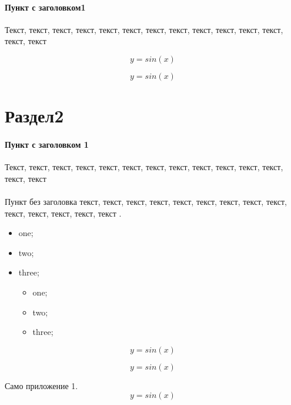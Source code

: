 \documentclass[12pt, final, a4paper, oneside]{extarticle}
\begin{document}
\paragraph{Пункт с заголовком1}
Текст, текст, текст, текст, текст, текст, текст, текст, текст, текст, текст, текст, текст, текст

\begin{equation}
  y = sin(x)
\end{equation}

\begin{equation}
  y = sin(x)
\end{equation}
\section{Раздел2}
\paragraph{Пункт с заголовком 1} Текст, текст, текст, текст, текст, текст, текст, текст, текст, текст, текст, текст, текст, текст
\paragraph{}Пункт без заголовка текст, текст, текст, текст, текст, текст, текст, текст, текст, текст, текст, текст, текст, текст  \cite{ltks, asd}.
\begin{itemize}
\item one;
\item two;
\item three;
  \begin{itemize}
  \item one;
  \item two;
  \item three;
  \end{itemize}
\end{itemize}

\begin{equation}
  y = sin(x)
\end{equation}

\begin{equation}
  y = sin(x)
\end{equation}

% 
% 
% 
% 
% 


%
\newpage
{}
Само приложение 1.
\newpage
\begin{equation}
  \label{eq:3}
  y = sin(x)
\end{equation}
\end{document}
